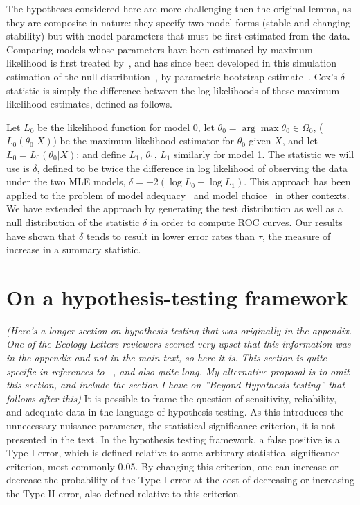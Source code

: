 \documentclass[authoryear,preprint,11pt]{elsarticle}
\newcommand{\cb}[1]{{\it \color{darkgreen} (#1)}}
\begin{document}
The hypotheses considered here are more challenging then the original lemma, as they are composite in nature:
they specify two model forms (stable and changing stability)
but with model parameters that must be first estimated from the data.
Comparing models whose parameters have been estimated by maximum likelihood is first treated by~\citet{Cox1961, Cox1962},
and has since been developed in this simulation estimation of the null distribution~\citep{McLachlan1987}, by parametric bootstrap estimate~\citep{Efron1987}.  
Cox's $\delta$ statistic is simply the difference between the log likelihoods of these maximum likelihood estimates, defined as follows.

Let $L_0$ be the likelihood function for model 0, 
let $\theta_0 = \arg \max \theta_0 \in \Omega_0$, ($L_0 (\theta_0 |X)$) 
be the maximum likelihood estimator for $\theta_0$ given $X$, and let $L_0 = L_0 (\theta_0 |X)$; 
and define $L_1$, $\theta_1$, $L_1$ similarly for model 1. 
The statistic we will use is $\delta$, 
defined to be twice the difference in log likelihood of observing the data under the two MLE models,
$\delta = -2 (\log L_0 - \log L_1 )$.  
This approach has been applied to the problem of model adequacy~\citep{Goldman1993} and model choice~\citep{Huelsenbeck1996} in other contexts.  
We have extended the approach by generating the test distribution as well as a null distribution of the statistic $\delta$ in order to compute ROC curves.  
Our results have shown that $\delta$ tends to result in lower error rates than $\tau$, the measure of increase in a summary statistic.  



\section{On a hypothesis-testing framework}\label{Dakos}
\cb{Here's a longer section on hypothesis testing that was originally in the appendix.  One of the Ecology Letters reviewers seemed very upset that this information was in the appendix and not in the main text, so here it is.  This section is quite specific in references to ~\citet{Dakos2008}, and also quite long.  My alternative proposal is to omit this section, and include the section I have on ''Beyond Hypothesis testing'' that follows after this}  
It is possible to frame the question of sensitivity, reliability, and adequate data in the language of hypothesis testing. As this introduces the unnecessary nuisance parameter, the statistical significance criterion, it is not presented in the text.  In the hypothesis testing framework, a false positive is a Type I error, which is defined relative to some arbitrary statistical significance criterion, most commonly 0.05.  By changing this criterion, one can increase or decrease the probability of the Type I error at the cost of decreasing or increasing the Type II error, also defined relative to this criterion.  
\end{document}
